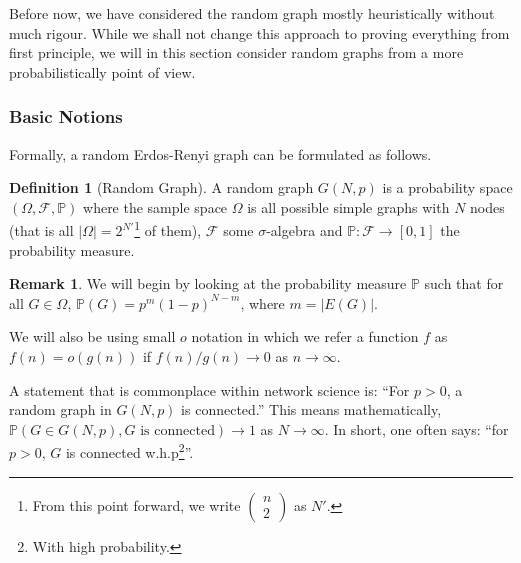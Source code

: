 \documentclass[
]{article}
\theoremstyle{definition}
\newtheorem*{remark}{Remark}
\theoremstyle{definition}
\newtheorem{definition}{Definition}[section]
\begin{document}
Before now, we have considered the random graph mostly heuristically
without much rigour. While we shall not change this approach to proving
everything from first principle, we will in this section consider random
graphs from a more probabilistically point of view.

\hypertarget{basic-notions}{%
\subsubsection{Basic Notions}\label{basic-notions}}

Formally, a random Erdos-Renyi graph can be formulated as follows.

\begin{definition}[Random Graph]
  A random graph \(G(N, p)\) is a probability space \((\Omega, \mathcal{F}, \mathbb{P})\) 
  where the sample space \(\Omega\) is all possible simple graphs with \(N\) 
  nodes (that is all \(\left| \Omega \right| = 2^{N'}\)\footnote{From this point 
  forward, we write \(\begin{pmatrix} n \\ 2 \end{pmatrix}\) as \(N'\).} of them), 
  \(\mathcal{F}\) some \(\sigma\)-algebra and \(\mathbb{P} : \mathcal{F} \to [0, 1]\) 
  the probability measure. 
\end{definition}

\begin{remark}
  We will begin by looking at the probability measure \(\mathbb{P}\) such that 
  for all \(G \in \Omega\), \(\mathbb{P}(G) = p^m (1 - p)^{N - m}\), where 
  \(m = \left| E(G) \right|\).
\end{remark}

We will also be using small \(o\) notation in which we refer a function
\(f\) as \(f(n) = o(g(n))\) if \(f(n) / g(n) \to 0\) as
\(n \to \infty\).

A statement that is commonplace within network science is: ``For
\(p > 0\), a random graph in \(G(N, p)\) is connected.'' This means
mathematically,
\(\mathbb{P}(G \in G(N, p), G \text{ is connected}) \to 1\) as
\(N \to \infty\). In short, one often says: ``for \(p > 0\), \(G\) is
connected w.h.p\footnote{With high probability.}''.
\end{document}
